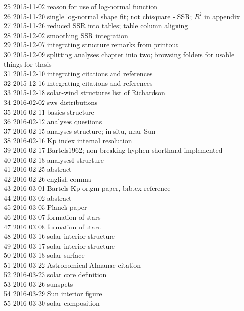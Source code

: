 \begin{footnotesize}
25	2015-11-02	reason for use of log-normal function\\
26	2015-11-20	single log-normal shape fit; not chisquare - SSR; $R^2$ in appendix\\
27	2015-11-26	reduced SSR into tables; table column aligning\\
28	2015-12-02	smoothing SSR integration\\
29	2015-12-07	integrating structure remarks from printout\\
30	2015-12-09	splitting analyses chapter into two; browsing folders for usable things for thesis\\
31	2015-12-10	integrating citations and references\\
32	2015-12-16	integrating citations and references\\
33	2015-12-18	solar-wind structures list of Richardson\\
34	2016-02-02	sws distributions\\
35	2016-02-11	basics structure\\
36	2016-02-12	analyses questions\\
37	2016-02-15	analyses structure; in situ, near-Sun\\
38	2016-02-16	Kp index internal resolution\\
39	2016-02-17	Bartels1962; non-breaking hyphen shorthand implemented\\
40	2016-02-18	analysesI structure\\
41	2016-02-25	abstract\\
42	2016-02-26	english comma\\
43	2016-03-01	Bartels Kp origin paper, bibtex reference\\
44	2016-03-02	abstract\\
45	2016-03-03	Planck paper\\
46	2016-03-07	formation of stars\\
47	2016-03-08	formation of stars\\
48	2016-03-16	solar interior structure\\
49	2016-03-17	solar interior structure\\
50	2016-03-18	solar surface\\
51	2016-03-22	Astronomical Almanac citation\\
52	2016-03-23	solar core definition\\
53	2016-03-26	sunspots\\
54	2016-03-29	Sun interior figure\\
55	2016-03-30	solar composition\\

\end{footnotesize}
